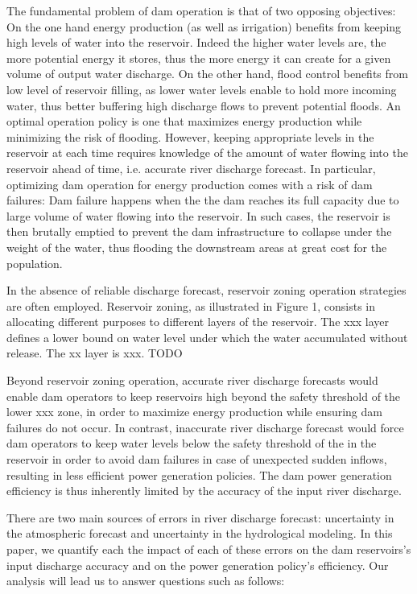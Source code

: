 \documentclass{article}
\begin{document}
The fundamental problem of dam operation is that of two opposing objectives\cite{}:
On the one hand energy production (as well as irrigation)
benefits from keeping high levels of water into the reservoir.
Indeed the higher water levels are, the more potential energy it stores,
thus the more energy it can create for a given volume of output water discharge.
On the other hand, flood control benefits from low level of reservoir filling,
as lower water levels enable to hold more incoming water,
thus better buffering high discharge flows to prevent potential floods.
An optimal operation policy is one that maximizes energy production while minimizing the risk of flooding.
However, keeping appropriate levels in the reservoir at each time requires knowledge
of the amount of water flowing into the reservoir ahead of time, i.e. accurate river discharge forecast.
In particular, optimizing dam operation for energy production comes with a risk of dam failures:
Dam failure happens when the the dam reaches its full capacity due to large volume
of water flowing into the reservoir.
In such cases, the reservoir is then brutally emptied to prevent the dam infrastructure to collapse
under the weight of the water, thus flooding the downstream areas
at great cost for the population.

In the absence of reliable discharge forecast,
reservoir zoning operation strategies are often employed.
Reservoir zoning, as illustrated in Figure 1,
consists in allocating different purposes to different layers of the reservoir.
The xxx layer defines a lower bound on water level under which the water accumulated without release.
The xx layer is xxx.
TODO

Beyond reservoir zoning operation, accurate river discharge forecasts would enable dam operators
to keep reservoirs high beyond the safety threshold of the lower xxx zone,
in order to maximize energy production
while ensuring dam failures do not occur.
In contrast, inaccurate river discharge forecast would force dam operators
to keep water levels below the safety threshold of the
in the reservoir in order to avoid dam failures in case of unexpected sudden inflows,
resulting in less efficient power generation policies.
The dam power generation efficiency is thus inherently limited by the accuracy of the input river discharge.

There are two main sources of errors in river discharge forecast:
uncertainty in the atmospheric forecast and uncertainty in the hydrological modeling.
In this paper, we quantify each the impact of each of these errors
on the dam reservoirs's input discharge accuracy
and on the power generation policy's efficiency.
Our analysis will lead us to answer questions such as follows:
\end{document}
